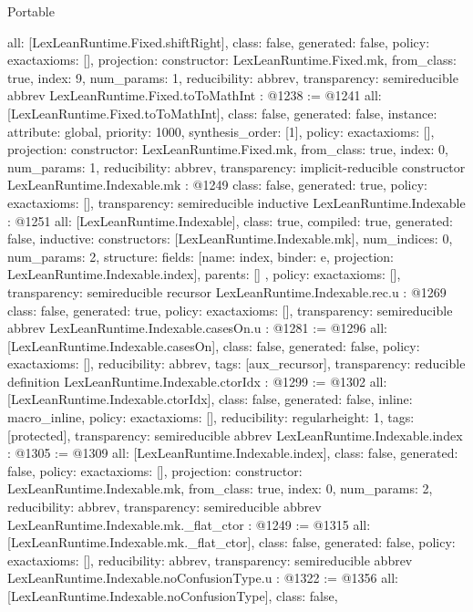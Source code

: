 \begin{lexlean}{Portable}
\begin{coremodule}
{  all: [LexLeanRuntime.Fixed.shiftRight],
  class: false,
  generated: false,
  policy: exact{axioms: []},
  projection: {constructor: LexLeanRuntime.Fixed.mk, from_class: true, index: 9, num_params: 1},
  reducibility: abbrev{},
  transparency: semireducible
}
abbrev LexLeanRuntime.Fixed.toToMathInt : @1238 := @1241 {
  all: [LexLeanRuntime.Fixed.toToMathInt],
  class: false,
  generated: false,
  instance: {attribute: global, priority: 1000, synthesis_order: [1]},
  policy: exact{axioms: []},
  projection: {constructor: LexLeanRuntime.Fixed.mk, from_class: true, index: 0, num_params: 1},
  reducibility: abbrev{},
  transparency: implicit-reducible
}
constructor LexLeanRuntime.Indexable.mk : @1249 {
  class: false,
  generated: true,
  policy: exact{axioms: []},
  transparency: semireducible
}
inductive LexLeanRuntime.Indexable : @1251 {
  all: [LexLeanRuntime.Indexable],
  class: true,
  compiled: true,
  generated: false,
  inductive: {
    constructors: [LexLeanRuntime.Indexable.mk],
    num_indices: 0,
    num_params: 2,
    structure: {
      fields: [{name: index, binder: e, projection: LexLeanRuntime.Indexable.index}],
      parents: []
    }
  },
  policy: exact{axioms: []},
  transparency: semireducible
}
recursor LexLeanRuntime.Indexable.rec.{u} : @1269 {
  class: false,
  generated: true,
  policy: exact{axioms: []},
  transparency: semireducible
}
abbrev LexLeanRuntime.Indexable.casesOn.{u} : @1281 := @1296 {
  all: [LexLeanRuntime.Indexable.casesOn],
  class: false,
  generated: false,
  policy: exact{axioms: []},
  reducibility: abbrev{},
  tags: [aux_recursor],
  transparency: reducible
}
definition LexLeanRuntime.Indexable.ctorIdx : @1299 := @1302 {
  all: [LexLeanRuntime.Indexable.ctorIdx],
  class: false,
  generated: false,
  inline: macro_inline,
  policy: exact{axioms: []},
  reducibility: regular{height: 1},
  tags: [protected],
  transparency: semireducible
}
abbrev LexLeanRuntime.Indexable.index : @1305 := @1309 {
  all: [LexLeanRuntime.Indexable.index],
  class: false,
  generated: false,
  policy: exact{axioms: []},
  projection: {constructor: LexLeanRuntime.Indexable.mk, from_class: true, index: 0, num_params: 2},
  reducibility: abbrev{},
  transparency: semireducible
}
abbrev LexLeanRuntime.Indexable.mk._flat_ctor : @1249 := @1315 {
  all: [LexLeanRuntime.Indexable.mk._flat_ctor],
  class: false,
  generated: false,
  policy: exact{axioms: []},
  reducibility: abbrev{},
  transparency: semireducible
}
abbrev LexLeanRuntime.Indexable.noConfusionType.{u} : @1322 := @1356 {
  all: [LexLeanRuntime.Indexable.noConfusionType],
  class: false,
}
\end{coremodule}
\end{lexlean}
